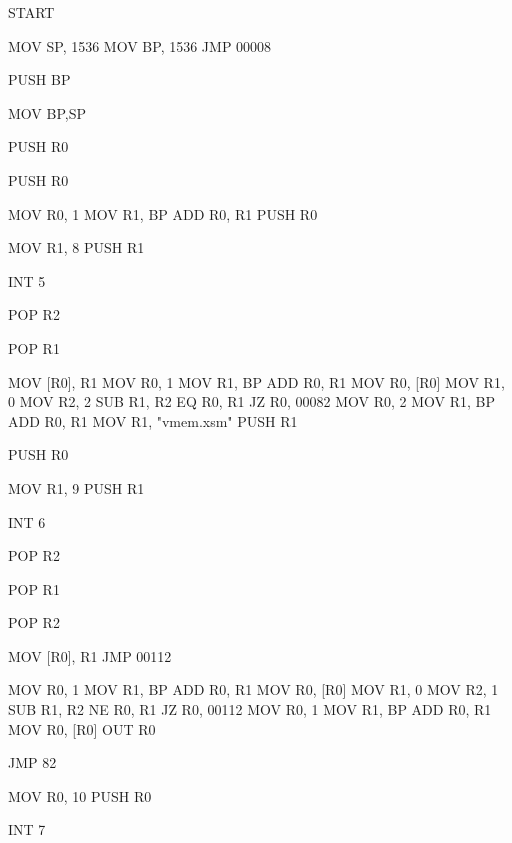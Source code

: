 START

MOV SP,
1536
MOV BP,
1536
JMP 00008

PUSH BP

MOV BP,SP

PUSH R0

PUSH R0

MOV R0,
1
MOV R1,
BP
ADD R0,
R1
PUSH R0

MOV R1,
8
PUSH R1

INT 5

POP R2

POP R1

MOV [R0],
R1
MOV R0,
1
MOV R1,
BP
ADD R0,
R1
MOV R0,
[R0]
MOV R1,
0
MOV R2,
2
SUB R1,
R2
EQ R0,
R1
JZ R0,
00082
MOV R0,
2
MOV R1,
BP
ADD R0,
R1
MOV R1,
"vmem.xsm"
PUSH R1

PUSH R0

MOV R1,
9
PUSH R1

INT 6

POP R2

POP R1

POP R2

MOV [R0],
R1
JMP 00112

MOV R0,
1
MOV R1,
BP
ADD R0,
R1
MOV R0,
[R0]
MOV R1,
0
MOV R2,
1
SUB R1,
R2
NE R0,
R1
JZ R0,
00112
MOV R0,
1
MOV R1,
BP
ADD R0,
R1
MOV R0,
[R0]
OUT R0

JMP 82

MOV R0,
10
PUSH R0

INT 7

